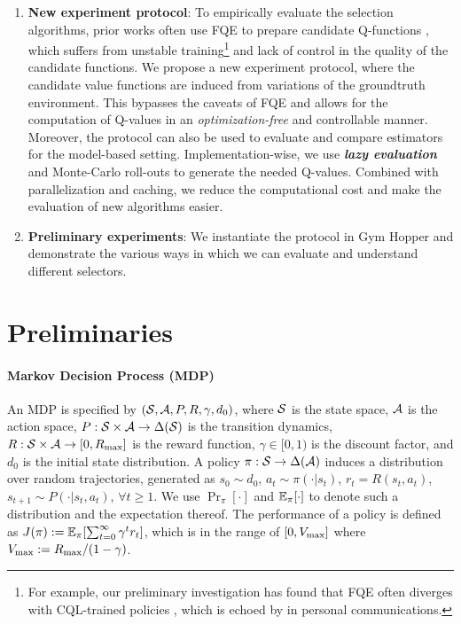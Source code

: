 \begin{enumerate}[leftmargin=*, itemsep=.5pt]
\item \textbf{New experiment protocol}: To empirically evaluate the selection algorithms, prior works often use FQE to prepare candidate Q-functions \cite{zhang2021towards, nie2022data}, which suffers from unstable training\footnote{For example, our preliminary investigation has found that FQE often diverges with CQL-trained policies \cite{kumar2020conservative}, which is echoed by \cite{nie2022data} in personal communications.} and lack of control in the quality of the candidate functions. We propose a new experiment protocol, where the candidate value functions are induced from variations of the groundtruth environment. This bypasses the caveats of FQE and allows for the computation of Q-values in an \textit{optimization-free} and controllable manner. Moreover, the protocol can also be used to evaluate and compare estimators for the model-based setting. Implementation-wise, we use \textbf{\textit{lazy evaluation}} and Monte-Carlo roll-outs to generate the needed Q-values.  Combined with parallelization and caching, we  reduce the computational cost and make the evaluation of new algorithms easier.
\item \textbf{Preliminary experiments}: We instantiate the protocol in Gym Hopper and demonstrate the various ways in which we can evaluate  and understand different selectors. 
\end{enumerate}



\section{Preliminaries}

\paragraph{Markov Decision Process (MDP)} 
An MDP is specified by $(\mathcal{S}, \mathcal{A}, P, R, \gamma, d_0)$, where $\mathcal{S}$ is the state space, $\mathcal{A}$ is the action space, $P: \mathcal{S}\times\mathcal{A} \to \Delta(\mathcal{S})$ is the transition dynamics, $R: \mathcal{S}\times\mathcal{A}\to[0,R_{\max}]$ is the reward function, $\gamma \in [0, 1)$ is the discount factor, and $d_0$ is the initial state distribution. A policy $\pi: \mathcal{S}\to\Delta(\mathcal{A})$ induces a distribution over random trajectories, generated as $s_0 \sim d_0$, $a_t \sim \pi(\cdot|s_t)$, $r_t = R(s_t, a_t)$, $s_{t+1} \sim P(\cdot|s_t, a_t)$, $\forall t \ge 1$. We use $\Pr_\pi[\cdot]$ and $\mathbb{E}_\pi[\cdot]$ to denote such a distribution and the expectation thereof. The performance of a policy is defined as $J(\pi):= \mathbb{E}_{\pi}[\sum_{t=0}^\infty \gamma^t r_t]$, which is in the range of $[0, V_{\max}]$ where $V_{\max}:= R_{\max}/(1-\gamma)$. %


